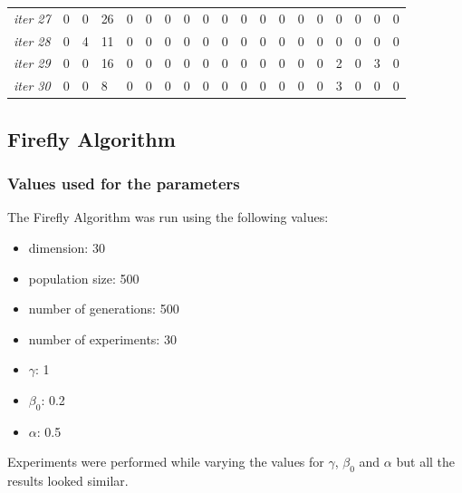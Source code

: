 \documentclass[12pt]{article}
\begin{document}
\begin{table}[ht]
{\begin{tabular}{lllllllllllllllllll}
									{\textit{iter 27}} &   0 &   0 &  26 &   0 &   0 &   0 &   0 &   0 &   0 &   0 &   0 &   0 &   0 &   0 &   0 &   0 &   0 &   0 \\ 
									{\textit{iter 28}} &   0 &   4 &  11 &   0 &   0 &   0 &   0 &   0 &   0 &   0 &   0 &   0 &   0 &   0 &   0 &   0 &   0 &   0 \\ 
									{\textit{iter 29}} &   0 &   0 &  16 &   0 &   0 &   0 &   0 &   0 &   0 &   0 &   0 &   0 &   0 &   0 &   2 &   0 &   3 &   0 \\ 
									{\textit{iter 30}} &   0 &   0 &   8 &   0 &   0 &   0 &   0 &   0 &   0 &   0 &   0 &   0 &   0 &   0 &   3 &   0 &   0 &   0 \\ 
									\hline
								\end{tabular}
							}
					\end{table}
		
			\subsection{Firefly Algorithm}
				\subsubsection{Values used for the parameters}
					The Firefly Algorithm was  run using  the following values:
					\begin{itemize}
						\item dimension: 30
						\item population size: 500
						\item number of generations: 500
						\item number of experiments: 30
						\item $\gamma$: 1
						\item $\beta_0$: 0.2
						\item $\alpha$: 0.5
					\end{itemize}
				
					Experiments were performed while varying the values for $\gamma$, $\beta_0$ and $\alpha$ but all the results looked similar.
					
\end{document}
